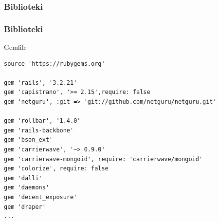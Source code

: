 \begin{frame}[fragile]
\frametitle{Biblioteki}
\end{frame}


\begin{frame}[fragile]
\frametitle{Biblioteki}
\begin{block}{Gemfile}
\begin{lstlisting}[style=Ruby,basicstyle=\tiny\ttfamily]
source 'https://rubygems.org'

gem 'rails', '3.2.21'
gem 'capistrano', '>= 2.15',require: false
gem 'netguru', :git => 'git://github.com/netguru/netguru.git'

gem 'rollbar', '1.4.0'
gem 'rails-backbone'
gem 'bson_ext'
gem 'carrierwave', '~> 0.9.0'
gem 'carrierwave-mongoid', require: 'carrierwave/mongoid'
gem 'colorize', require: false
gem 'dalli'
gem 'daemons'
gem 'decent_exposure'
gem 'draper'
...
\end{lstlisting}
\end{block}
\end{frame}

